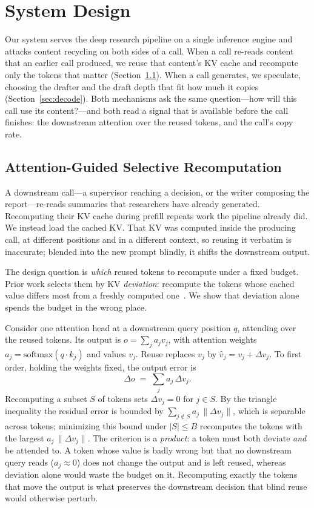 \section{System Design}
\label{sec:method}

Our system serves the deep research pipeline on a single inference engine and attacks content recycling on both sides of a call. When a call re-reads content that an earlier call produced, we reuse that content's KV cache and recompute only the tokens that matter (Section~\ref{sec:kvreuse}). When a call generates, we speculate, choosing the drafter and the draft depth that fit how much it copies (Section~\ref{sec:decode}). Both mechanisms ask the same question---how will this call use its content?---and both read a signal that is available before the call finishes: the downstream attention over the reused tokens, and the call's copy rate.

\subsection{Attention-Guided Selective Recomputation}
\label{sec:kvreuse}

A downstream call---a supervisor reaching a decision, or the writer composing the report---re-reads summaries that researchers have already generated. Recomputing their KV cache during prefill repeats work the pipeline already did. We instead load the cached KV. That KV was computed inside the producing call, at different positions and in a different context, so reusing it verbatim is inaccurate; blended into the new prompt blindly, it shifts the downstream output.

The design question is \emph{which} reused tokens to recompute under a fixed budget. Prior work selects them by KV \emph{deviation}: recompute the tokens whose cached value differs most from a freshly computed one~\cite{cacheblend}. We show that deviation alone spends the budget in the wrong place.

Consider one attention head at a downstream query position $q$, attending over the reused tokens. Its output is $o=\sum_j a_j v_j$, with attention weights $a_j=\mathrm{softmax}(q\cdot k_j)$ and values $v_j$. Reuse replaces $v_j$ by $\hat v_j=v_j+\Delta v_j$. To first order, holding the weights fixed, the output error is
\begin{equation}
\Delta o \;=\; \sum_j a_j\,\Delta v_j .
\label{eq:drift}
\end{equation}
Recomputing a subset $S$ of tokens sets $\Delta v_j=0$ for $j\in S$. By the triangle inequality the residual error is bounded by $\sum_{j\notin S} a_j\,\|\Delta v_j\|$, which is separable across tokens; minimizing this bound under $|S|\le B$ recomputes the tokens with the largest $a_j\,\|\Delta v_j\|$. The criterion is a \emph{product}: a token must both deviate \emph{and} be attended to. A token whose value is badly wrong but that no downstream query reads ($a_j\approx 0$) does not change the output and is left reused, whereas deviation alone would waste the budget on it. Recomputing exactly the tokens that move the output is what preserves the downstream decision that blind reuse would otherwise perturb.

